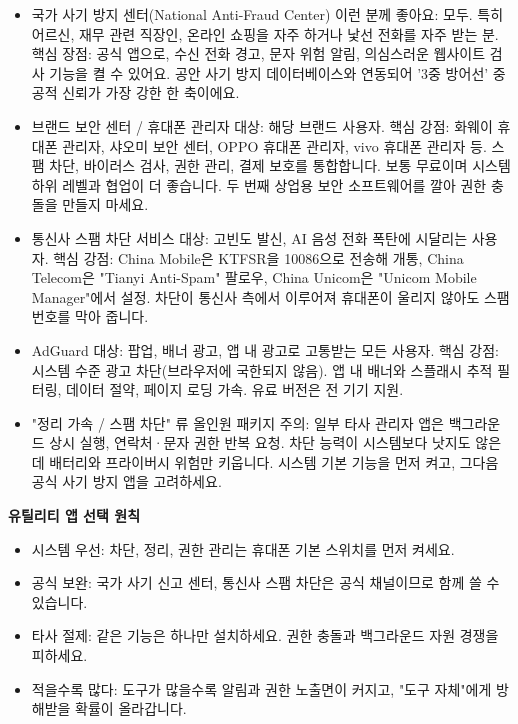 
\begin{itemize}
  \item 국가 사기 방지 센터(National Anti-Fraud Center) 이런 분께 좋아요: 모두. 특히 어르신, 재무 관련 직장인, 온라인 쇼핑을 자주 하거나 낯선 전화를 자주 받는 분. 핵심 장점: 공식 앱으로, 수신 전화 경고, 문자 위험 알림, 의심스러운 웹사이트 검사 기능을 켤 수 있어요. 공안 사기 방지 데이터베이스와 연동되어 '3중 방어선' 중 공적 신뢰가 가장 강한 한 축이에요.
  \item 브랜드 보안 센터 / 휴대폰 관리자 대상: 해당 브랜드 사용자. 핵심 강점: 화웨이 휴대폰 관리자, 샤오미 보안 센터, OPPO 휴대폰 관리자, vivo 휴대폰 관리자 등. 스팸 차단, 바이러스 검사, 권한 관리, 결제 보호를 통합합니다. 보통 무료이며 시스템 하위 레벨과 협업이 더 좋습니다. 두 번째 상업용 보안 소프트웨어를 깔아 권한 충돌을 만들지 마세요.
  \item 통신사 스팸 차단 서비스 대상: 고빈도 발신, AI 음성 전화 폭탄에 시달리는 사용자. 핵심 강점: China Mobile은 KTFSR을 10086으로 전송해 개통, China Telecom은 "Tianyi Anti-Spam" 팔로우, China Unicom은 "Unicom Mobile Manager"에서 설정. 차단이 통신사 측에서 이루어져 휴대폰이 울리지 않아도 스팸 번호를 막아 줍니다.
  \item AdGuard 대상: 팝업, 배너 광고, 앱 내 광고로 고통받는 모든 사용자. 핵심 강점: 시스템 수준 광고 차단(브라우저에 국한되지 않음). 앱 내 배너와 스플래시 추적 필터링, 데이터 절약, 페이지 로딩 가속. 유료 버전은 전 기기 지원.
  \item "정리 가속 / 스팸 차단" 류 올인원 패키지 주의: 일부 타사 관리자 앱은 백그라운드 상시 실행, 연락처·문자 권한 반복 요청. 차단 능력이 시스템보다 낫지도 않은데 배터리와 프라이버시 위험만 키웁니다. 시스템 기본 기능을 먼저 켜고, 그다음 공식 사기 방지 앱을 고려하세요.
\end{itemize}

\textbf{유틸리티 앱 선택 원칙}\par

\begin{itemize}
  \item 시스템 우선: 차단, 정리, 권한 관리는 휴대폰 기본 스위치를 먼저 켜세요.
  \item 공식 보완: 국가 사기 신고 센터, 통신사 스팸 차단은 공식 채널이므로 함께 쓸 수 있습니다.
  \item 타사 절제: 같은 기능은 하나만 설치하세요. 권한 충돌과 백그라운드 자원 경쟁을 피하세요.
  \item 적을수록 많다: 도구가 많을수록 알림과 권한 노출면이 커지고, "도구 자체"에게 방해받을 확률이 올라갑니다.
\end{itemize}

